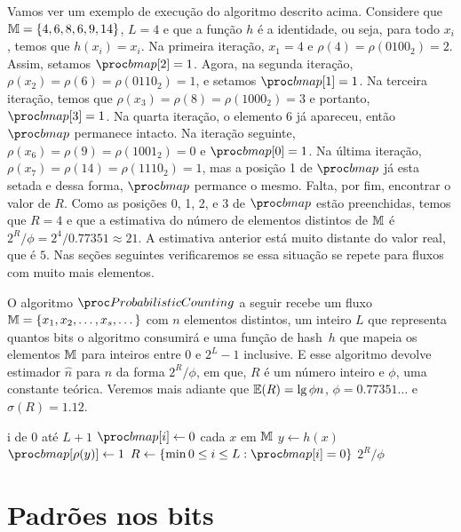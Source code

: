 Vamos ver um exemplo de execução do algoritmo descrito acima. Considere que $\mathbb{M} = \{ 4, 6, 8, 6, 9, 14 \}$, $L = 4$ e
que a função $h$ é a identidade, ou seja, para todo $x_i$, temos que $h(x_i) = x_i$. Na primeira iteração, $x_1 = 4$ e 
$\rho(4) = \rho(0100_2) = 2$. Assim, setamos $\bitmap[2] = 1$. Agora, na segunda iteração, 
$\rho(x_2) = \rho(6) = \rho(0110_2) = 1$, e setamos $\bitmap[1] = 1$. Na terceira iteração, temos que 
$\rho(x_3) = \rho(8) = \rho(1000_2) = 3$ e portanto, $\bitmap[3] = 1$. Na quarta iteração, o elemento $6$ já apareceu, 
então $\bitmap$ permanece intacto. Na iteração seguinte, $\rho(x_6) = \rho(9) = \rho(1001_2) = 0$ e $\bitmap[0] = 1$.
Na última iteração, $\rho(x_7) = \rho(14) = \rho(1110_2) = 1$, mas a posição 1 de $\bitmap$ já esta setada e dessa forma,
$\bitmap$ permance o mesmo. Falta, por fim, encontrar o valor de $R$. Como as posições 0, 1, 2, e 3 de $\bitmap$ estão
preenchidas, temos que $R = 4$ e que a estimativa do número de elementos distintos de $\mathbb{M}$ é 
$2^{R}/\phi = 2^4/0.77351 \approx 21$. A estimativa anterior está muito distante do valor real, que é $5$. Nas seções
seguintes verificaremos se essa situação se repete para fluxos com muito mais elementos.

O algoritmo $\pc$ a seguir recebe um fluxo $\mathbb{M} = \{ x_1, x_2, \dots, x_s, \dots \}$ com $n$ elementos distintos, 
um inteiro $L$ que representa quantos bits o algoritmo consumirá e uma função de hash~$h$ que mapeia os elementos $\mathbb{M}$ 
para inteiros entre $0$ e $2^L - 1$ inclusive. E esse algoritmo devolve estimador $\hat{n}$ para $n$ da forma 
$2^{R}/\phi$, em que, $R$ é um número inteiro e $\phi$, uma constante teórica. Veremos mais adiante que 
$\mathbb{E}(R) = \lg \phi n$, $\phi = 0.77351{\dots}$ e $\sigma(R) = 1.12$.

\begin{codebox}
  \li \For i de $0$ até $L + 1$
      \Do
  \li    $\bitmap[i] \gets 0$
      \End
  \li \For cada $x$ em $\mathbb{M}$                               \label{li:pc:for:start}
      \Do
  \li   $y \gets h(x)$
  \li   $\bitmap[\rho(y)] \gets 1$                          \label{li:pc:for:end}
      \End
  \li $R \gets \{ \min 0 \leq i \leq L: \bitmap[i] = 0 \}$  \label{li:pc:r:def}
  \li\Return $2^R/\phi$
  \End
\end{codebox}

\section{Padrões nos bits}
\label{sec:flajolet-martin:pattern}

